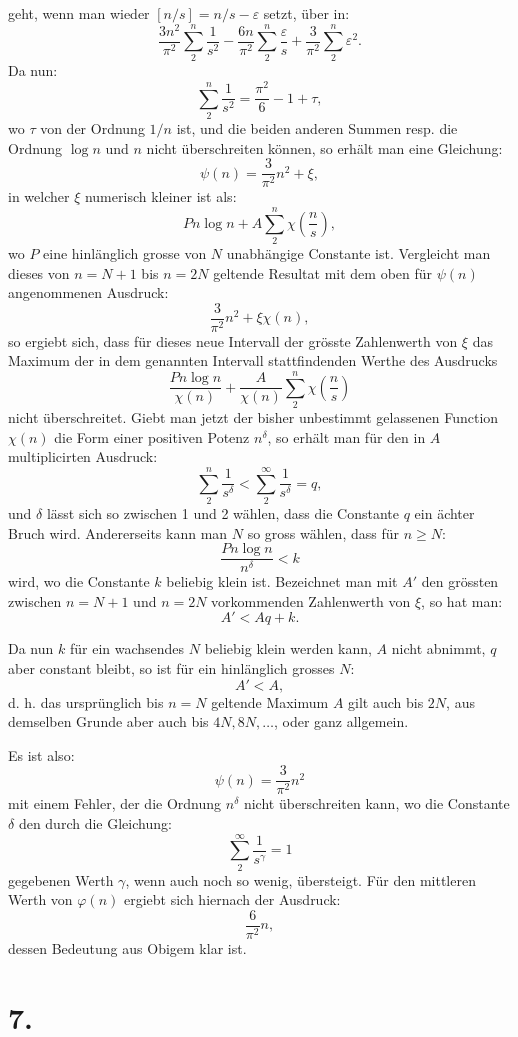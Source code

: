\documentclass[11pt]{article}
\newcommand{\floor}[1]{\left[#1\right]}
\begin{document}
geht, wenn man wieder $\floor{n/s}=n/s-\varepsilon$ setzt, über in:
\[
 \frac{3n^2}{\pi^2}\sum_{2}^{n}\frac1{s^2}
 -\frac{6n}{\pi^2}\sum_{2}^{n}\frac{\varepsilon}{s}
 +\frac3{\pi^2}\sum_{2}^{n}\varepsilon^2.
\]
Da nun:
\[
 \sum_{2}^{n}\frac1{s^2}=\frac{\pi^2}{6}-1+\tau,
\]
wo $\tau$ von der Ordnung $1/n$ ist, und die beiden anderen Summen resp. die Ordnung $\log n$ und $n$ nicht überschreiten können, so erhält man eine Gleichung:
\[
 \psi(n)=\frac3{\pi^2}n^2+\xi,
\]
in welcher $\xi$ numerisch kleiner ist als:
\[
 Pn\log n+A\sum_{2}^{n}\chi\left(\frac ns\right),
\]
wo $P$ eine hinlänglich grosse von $N$ unabhängige Constante ist. Vergleicht man dieses von $n=N+1$ bis $n=2N$ geltende Resultat mit dem oben für $\psi(n)$ angenommenen Ausdruck:
\[
 \frac3{\pi^2}n^2+\xi\chi(n),
\]
so ergiebt sich, dass für dieses neue Intervall der grösste Zahlenwerth von $\xi$ das Maximum der in dem genannten Intervall stattfindenden Werthe des Ausdrucks
\[
 \frac{Pn\log n}{\chi(n)}+\frac{A}{\chi(n)}\sum_{2}^{n}\chi\left(\frac ns\right)
\]
nicht überschreitet. Giebt man jetzt der bisher unbestimmt gelassenen Function $\chi(n)$ die Form einer positiven Potenz $n^\delta$, so erhält man für den in $A$ multiplicirten Ausdruck:
\[
 \sum_{2}^{n}\frac1{s^\delta}<\sum_{2}^{\infty}\frac1{s^\delta}=q,
\]
und $\delta$ lässt sich so zwischen 1 und 2 wählen, dass die Constante $q$ ein ächter Bruch wird. Andererseits kann man $N$ so gross wählen, dass für $n\geq N$:
\[
 \frac{Pn\log n}{n^\delta}<k
\]
wird, wo die Constante $k$ beliebig klein ist. Bezeichnet man mit $A'$ den grössten zwischen $n=N+1$ und $n=2N$ vorkommenden Zahlenwerth von $\xi$, so hat man:
\[
 A'<Aq+k.
\]

Da nun $k$ für ein wachsendes $N$ beliebig klein werden kann, $A$ nicht abnimmt, $q$ aber constant bleibt, so ist für ein hinlänglich grosses $N$:
\[
 A'<A,
\]
d. h. das ursprünglich bis $n=N$ geltende Maximum $A$ gilt auch bis $2N$, aus demselben Grunde aber auch bis $4N,8N,\ldots$, oder ganz allgemein.

Es ist also:
\[
 \psi(n)=\frac3{\pi^2}n^2
\]
mit einem Fehler, der die Ordnung $n^\delta$ nicht überschreiten kann, wo die Constante $\delta$ den durch die Gleichung:
\[
 \sum_{2}^{\infty}\frac1{s^\gamma}=1
\]
gegebenen Werth $\gamma$, wenn auch noch so wenig, übersteigt. Für den mittleren Werth von $\varphi(n)$ ergiebt sich hiernach der Ausdruck:
\[
 \frac6{\pi^2}n,
\]
dessen Bedeutung aus Obigem klar ist.

\section*{7.}
\end{document}
